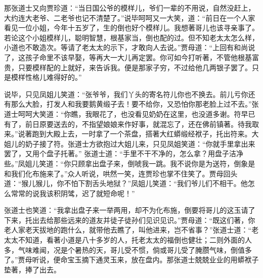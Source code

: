 \begin{parag}


    那张道士又向贾珍道：“当日国公爷的模样儿，爷们一辈的不用说，自然没赶上，大约连大老爷、二老爷也记不清楚了。”说毕呵呵又一大笑，道：“前日在一个人家看见一位小姐，今年十五岁了，生的倒也好个模样儿。我想著哥儿也该寻亲事了。若论这个小姐模样儿，聪明智慧，根基家当，倒也配的过。但不知老太太怎么样，小道也不敢造次。等请了老太太的示下，才敢向人去说。”贾母道：“上回有和尚说了，这孩子命里不该早娶，等再大一大儿再定罢。你可如今打听著，不管他根基富贵，只要模样配的上就好，来告诉我。便是那家子穷，不过给他几两银子罢了。只是模样性格儿难得好的。”
\end{parag}


\begin{parag}


    说毕，只见凤姐儿笑道：“张爷爷，我们丫头的寄名符儿你也不换去。前儿亏你还有那么大脸，打发人和我要鹅黄缎子去！要不给你，又恐怕你那老脸上过不去。”张道士呵呵大笑道：“你瞧，我眼花了，也没看见奶奶在这里，也没道多谢。符早已有了，前日原要送去的，不指望娘娘来作好事，就混忘了，还在佛前镇著。待我取来。”说著跑到大殿上去，一时拿了一个茶盘，搭著大红蟒缎经袱子，托出符来。大姐儿的奶子接了符。张道士方欲抱过大姐儿来，只见凤姐笑道：“你就手里拿出来罢了，又用个盘子托著。” 张道士道：“手里不干不净的，怎么拿？用盘子洁净些。”凤姐儿笑道：“你只顾拿出盘子来，倒唬我一跳。我不说你是为送符，倒象是和我们化布施来了。”众人听说，哄然一笑，连贾珍也掌不住笑了。贾母回头道：“猴儿猴儿，你不怕下割舌头地狱？”凤姐儿笑道：“我们爷儿们不相干。他怎么常常的说我该积阴骘，迟了就短命呢！”
\end{parag}


\begin{parag}


    张道士也笑道：“我拿出盘子来一举两用，却不为化布施，倒要将哥儿的这玉请了下来，托出去给那些远来的道友并徒子徒孙们见识见识。”贾母道：“既这们著，你老人家老天拔地的跑什么，就带他去瞧了，叫他进来，岂不省事？”张道士道：“老太太不知道，看著小道是八十多岁的人，托老太太的福倒也健壮；二则外面的人多，气味难闻，况是个暑热的天，哥儿受不惯，倘或哥儿受了腌臜气味，倒值多了。”贾母听说，便命宝玉摘下通灵玉来，放在盘内。那张道士兢兢业业的用蟒袱子垫著，捧了出去。
\end{parag}


